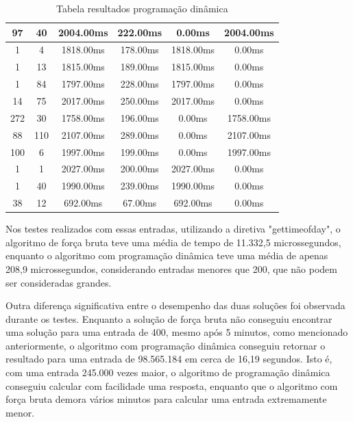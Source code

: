 \documentclass[12pt]{article}
\begin{document}
\begin{table}[!ht]
\begin{tabular}{|c|c|c|c|c|c|}
                97 & 40 & 2004.00ms & 222.00ms & 0.00ms & 2004.00ms \\ \hline
                1 & 4 & 1818.00ms & 178.00ms & 1818.00ms & 0.00ms \\ \hline
                1 & 13 & 1815.00ms & 189.00ms & 1815.00ms & 0.00ms \\ \hline
                1 & 84 & 1797.00ms & 228.00ms & 1797.00ms & 0.00ms \\ \hline
                14 & 75 & 2017.00ms & 250.00ms & 2017.00ms & 0.00ms \\ \hline
                272 & 30 & 1758.00ms & 196.00ms & 0.00ms & 1758.00ms \\ \hline
                88 & 110 & 2107.00ms & 289.00ms & 0.00ms & 2107.00ms \\ \hline
                100 & 6 & 1997.00ms & 199.00ms & 0.00ms & 1997.00ms \\ \hline
                1 & 1 & 2027.00ms & 200.00ms & 2027.00ms & 0.00ms \\ \hline
                1 & 40 & 1990.00ms & 239.00ms & 1990.00ms & 0.00ms \\ \hline
                38 & 12 & 692.00ms & 67.00ms & 692.00ms & 0.00ms \\ \hline
            \end{tabular}
            \caption{Tabela resultados programação dinâmica}
            \label{Tabela: Programacao Dinamica}
        \end{table}
        Nos testes realizados com essas entradas, utilizando a diretiva "gettimeofday", o algoritmo de força 
        bruta teve uma média de tempo de 11.332,5 microssegundos, enquanto o algoritmo com programação dinâmica 
        teve uma média de apenas 208,9 microssegundos, considerando entradas menores que 200, que não podem ser 
        consideradas grandes.

        Outra diferença significativa entre o desempenho das duas soluções foi observada durante os testes. 
        Enquanto a solução de força bruta não conseguiu encontrar uma solução para uma entrada de 400, mesmo 
        após 5 minutos, como mencionado anteriormente, o algoritmo com programação dinâmica conseguiu retornar 
        o resultado para uma entrada de 98.565.184 em cerca de 16,19 segundos. Isto é, com uma entrada 245.000 
        vezes maior, o algoritmo de programação dinâmica conseguiu calcular com facilidade uma resposta, enquanto 
        que o algoritmo com força bruta demora vários minutos para calcular uma entrada extremamente menor.
        
\end{document}
